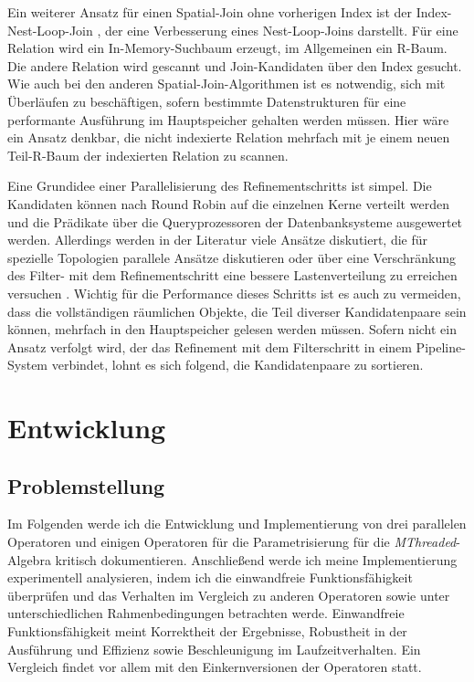 \documentclass[a4paper,12pt,twoside]{article}
\newcommand{\Fb}[1]{\textit{#1}} %
\begin{document}
Ein weiterer Ansatz für einen Spatial-Join ohne vorherigen Index ist der Index-Nest-Loop-Join \parencite[S. 10f]{Jacox2007}, der eine Verbesserung eines Nest-Loop-Joins 
darstellt. Für eine Relation wird ein In-Memory-Suchbaum erzeugt, im Allgemeinen ein R-Baum. Die andere Relation wird gescannt und Join-Kandidaten über den Index gesucht. Wie auch bei den anderen Spatial-Join-Algorithmen ist es notwendig, sich mit Überläufen zu beschäftigen, sofern bestimmte Datenstrukturen für eine performante Ausführung im Hauptspeicher gehalten werden müssen. Hier wäre ein Ansatz denkbar, die nicht indexierte Relation mehrfach mit je einem neuen Teil-R-Baum der indexierten Relation zu scannen. 

Eine Grundidee einer Parallelisierung des Refinementschritts ist simpel. Die Kandidaten können nach Round Robin auf die einzelnen Kerne verteilt werden und die Prädikate über die Queryprozessoren der Datenbanksysteme ausgewertet werden. Allerdings werden in der Literatur viele Ansätze diskutiert, die für spezielle Topologien parallele Ansätze diskutieren \parencite{Bouros2019, Rigaux2001} oder über eine Verschränkung des Filter- mit dem Refinementschritt eine bessere Lastenverteilung zu erreichen versuchen \parencite{Brinkhoff1996, Jacox2007, Zhou1998}. Wichtig für die Performance dieses Schritts ist es auch zu vermeiden, dass die vollständigen räumlichen Objekte, die Teil diverser Kandidatenpaare sein können, mehrfach in den Hauptspeicher gelesen werden müssen. Sofern nicht ein Ansatz verfolgt wird, der das Refinement mit dem Filterschritt in einem Pipeline-System verbindet, lohnt es sich {\textcite[ S. 45f]{Jacox2007}} folgend, die Kandidatenpaare zu sortieren.

\section{Entwicklung}

\subsection{Problemstellung}
\label{problem}

Im Folgenden werde ich die Entwicklung und Implementierung von drei parallelen Operatoren und einigen Operatoren für die Parametrisierung für die \Fb{MThreaded}-Algebra kritisch dokumentieren. Anschließend werde ich meine Implementierung experimentell analysieren, indem ich die einwandfreie Funktionsfähigkeit überprüfen und das Verhalten im Vergleich zu anderen Operatoren sowie unter unterschiedlichen Rahmenbedingungen betrachten werde. Einwandfreie Funktionsfähigkeit meint Korrektheit der Ergebnisse, Robustheit in der Ausführung und Effizienz sowie Beschleunigung im Laufzeitverhalten. Ein Vergleich findet vor allem mit den Einkernversionen der Operatoren statt.
\end{document}
